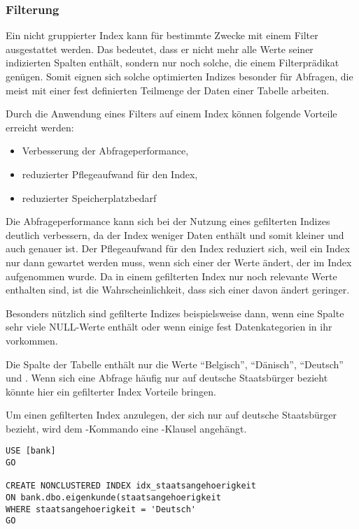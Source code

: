       \subsubsection{Filterung}
        Ein nicht gruppierter Index kann für bestimmte Zwecke mit einem Filter
        ausgestattet werden. Das bedeutet, dass er nicht mehr alle Werte seiner
        indizierten Spalten enthält, sondern nur noch solche, die einem
        Filterprädikat genügen. Somit eignen sich solche optimierten Indizes
        besonder für Abfragen, die meist mit einer fest definierten Teilmenge
        der Daten einer Tabelle arbeiten.
        
        Durch die Anwendung eines Filters auf einem Index können folgende
        Vorteile erreicht werden:
        \begin{itemize}
            \item Verbesserung der Abfrageperformance,
            \item reduzierter Pflegeaufwand für den Index,
            \item reduzierter Speicherplatzbedarf
        \end{itemize}
        Die Abfrageperformance kann sich bei der Nutzung eines gefilterten
        Indizes deutlich verbessern, da der Index weniger Daten enthält und
        somit kleiner und auch genauer ist. Der Pflegeaufwand für den Index
        reduziert sich, weil ein Index nur dann gewartet werden muss, wenn sich
        einer der Werte ändert, der im Index aufgenommen wurde. Da in einem
        gefilterten Index nur noch relevante Werte enthalten sind, ist die
        Wahrscheinlichkeit, dass sich einer davon ändert geringer.
        
        Besonders nützlich sind gefilterte Indizes beispielsweise dann, wenn
        eine Spalte sehr viele NULL-Werte enthält oder wenn einige fest
        Datenkategorien in ihr vorkommen. 
        
        Die Spalte  der Tabelle
         enthält nur die Werte \enquote{Belgisch},
        \enquote{Dänisch}, \enquote{Deutsch} und . Wenn
        sich eine Abfrage häufig nur auf deutsche Staatsbürger bezieht könnte
        hier ein gefilterter Index Vorteile bringen.
        
        Um einen gefilterten Index anzulegen, der sich nur auf deutsche
        Staatsbürger bezieht, wird dem -Kommando
        eine \WHERE-Klausel angehängt.
        \begin{lstlisting}[language=ms_sql, caption={Einen gefilterten Index
        erstellen}, label=admin05_12]
USE [bank]
GO

CREATE NONCLUSTERED INDEX idx_staatsangehoerigkeit
ON bank.dbo.eigenkunde(staatsangehoerigkeit
WHERE staatsangehoerigkeit = 'Deutsch'
GO
        \end{lstlisting}
        \begin{literaturinternet}
          \item \cite{cc280372}
        \end{literaturinternet}
